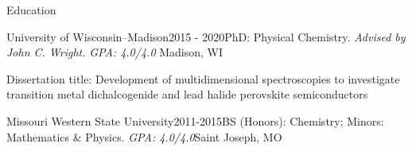 \documentclass{resume} %
\begin{document}
\begin{rSection}{Education}

\begin{rSubsection}{University of Wisconsin--Madison}{2015 - 2020}{PhD: Physical Chemistry. \emph{Advised by John C. Wright.} \emph{GPA: 4.0/4.0} }{Madison, WI}
\item Dissertation title: Development of multidimensional spectroscopies to investigate transition metal dichalcogenide and lead halide perovskite semiconductors
\end{rSubsection}

\begin{rSubsectionlistless}{Missouri Western State University}{2011-2015}{BS (Honors): Chemistry; Minors: Mathematics \& Physics. \emph{GPA: 4.0/4.0}}{Saint Joseph, MO} 
\end{rSubsectionlistless}



\end{rSection}
\end{document}

